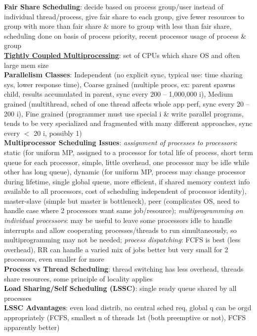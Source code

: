 \documentclass[a4paper]{article}
\begin{document}
\begin{multicols}{2}
        \textbf{Fair Share Scheduling}: decide based on process group/user instead of individual thread/process, give fair share to each group, give fewer resources to group with more than fair share \& more to group with less than fair share, scheduling done on basis of process priority, recent processor usage of process \& group\\
        \underline{\textbf{Tightly Coupled Multiprocessing}}: set of CPUs which share OS and often large mem size\\
        \textbf{Parallelism Classes}: Independent (no explicit sync, typical use: time sharing sys, lower response time), Coarse grained (multiple procs, ex: parent spawns child, results accumulated in parent, sync every 200 – 1,000,000 i), Medium grained (multithread, sched of one thread affects whole app perf, sync every 20 – 200 i), Fine grained (programmer must use special i \& write parallel programs, tends to be very specialized and fragmented with many different approaches, sync every $<$ 20 i, possibly 1)\\
        \textbf{Multiprocessor Scheduling Issues}:
        \textit{assignment of processes to processors}: static (for uniform MP, assigned to a processor for total life of process, short term queue for each processor, simple, little overhead, one processor may be idle while other has long queue), dynamic (for uniform MP, process may change processor during lifetime, single global queue, more efficient, if shared memory context info available to all processors, cost of scheduling independent of processor identity), master-slave (simple but master is bottleneck), peer (complicates OS, need to handle case where 2 processors want same job/resource);
        \textit{multiprogramming on individual processors}: may be useful to leave some processors idle to handle interrupts and allow cooperating processes/threads to run simultaneously, so multiprogramming may not be needed;
        \textit{process dispatching}: FCFS is best (less overhead), RR can handle a varied mix of jobs better but very small for 2 processors, even smaller for more\\
        \textbf{Process vs Thread Scheduling}: thread switching has less overhead, threads share resources, some principle of locality applies\\
        \textbf{Load Sharing/Self Scheduling (LSSC)}: single ready queue shared by all processes\\
        \textbf{LSSC Advantages}: even load distrib, no central sched req, global q can be orgd appropriately (FCFS, smallest n of threads 1st (both preemptive or not), FCFS apparently better)\\

\end{multicols}
\end{document}
